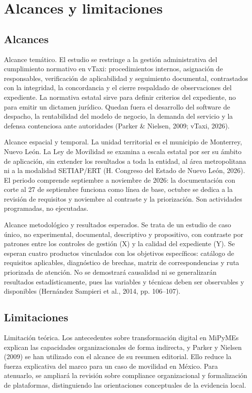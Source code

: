 {\section{Alcances y limitaciones}
\subsection{Alcances}
Alcance temático. El estudio se restringe a la gestión administrativa del cumplimiento normativo en vTaxi: procedimientos internos, asignación de responsables, verificación de aplicabilidad y seguimiento documental, contrastados con la integridad, la concordancia y el cierre respaldado de observaciones del expediente. La normativa estatal sirve para definir criterios del expediente, no para emitir un dictamen jurídico. Quedan fuera el desarrollo del software de despacho, la rentabilidad del modelo de negocio, la demanda del servicio y la defensa contenciosa ante autoridades (Parker \& Nielsen, 2009; vTaxi, 2026).


Alcance espacial y temporal. La unidad territorial es el municipio de Monterrey, Nuevo León. La Ley de Movilidad se examina a escala estatal por ser su ámbito de aplicación, sin extender los resultados a toda la entidad, al área metropolitana ni a la modalidad SETIAP/ERT (H. Congreso del Estado de Nuevo León, 2026). El periodo comprende septiembre a noviembre de 2026: la documentación con corte al 27 de septiembre funciona como línea de base, octubre se dedica a la revisión de requisitos y noviembre al contraste y la priorización. Son actividades programadas, no ejecutadas.


Alcance metodológico y resultados esperados. Se trata de un estudio de caso único, no experimental, documental, descriptivo y propositivo, con contraste por patrones entre los controles de gestión (X) y la calidad del expediente (Y). Se esperan cuatro productos vinculados con los objetivos específicos: catálogo de requisitos aplicables, diagnóstico de brechas, matriz de correspondencias y ruta priorizada de atención. No se demostrará causalidad ni se generalizarán resultados estadísticamente, pues las variables y técnicas deben ser observables y disponibles (Hernández Sampieri et al., 2014, pp. 106–107).


\subsection{Limitaciones}
Limitación teórica. Los antecedentes sobre transformación digital en MiPyMEs explican las capacidades organizacionales de forma indirecta, y Parker y Nielsen (2009) se han utilizado con el alcance de su resumen editorial. Ello reduce la fuerza explicativa del marco para un caso de movilidad en México. Para atenuarlo, se ampliará la revisión sobre compliance organizacional y formalización de plataformas, distinguiendo las orientaciones conceptuales de la evidencia local.


}
